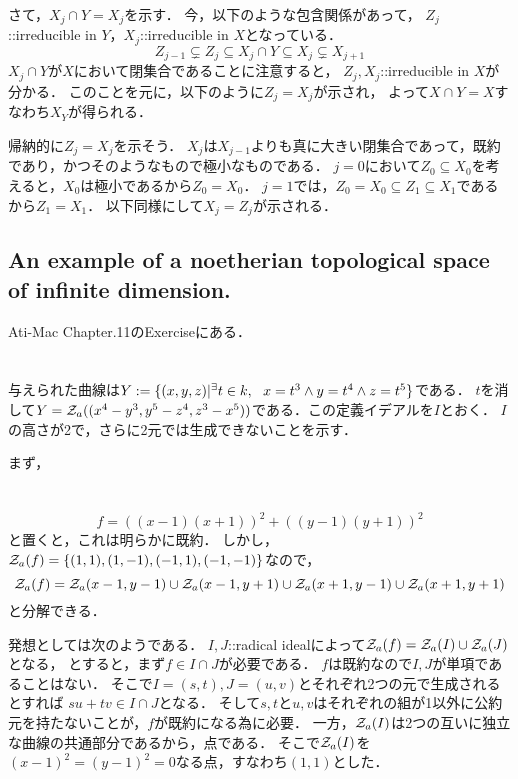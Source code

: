 \documentclass[a4paper]{jsarticle}
\begin{document}
    さて，$X_j \cap Y=X_j$を示す．
    今，以下のような包含関係があって，
    $Z_j$::irreducible in $Y$，$X_j$::irreducible in $X$となっている．
    \[ Z_{j-1} \subsetneq Z_j \subseteq X_j \cap Y \subseteq X_j \subsetneq X_{j+1} \]
    $X_j \cap Y$が$X$において閉集合であることに注意すると，
    $Z_j, X_j$::irreducible in $X$が分かる．
    このことを元に，以下のように$Z_j=X_j$が示され，
    よって$X \cap Y=X$すなわち$X_Y$が得られる．

    帰納的に$Z_j=X_j$を示そう．
    $X_j$は$X_{j-1}$よりも真に大きい閉集合であって，既約であり，かつそのようなもので極小なものである．
    $j=0$において$Z_0 \subseteq X_0$を考えると，$X_0$は極小であるから$Z_0=X_0$．
    $j=1$では，$Z_0=X_0 \subseteq Z_1 \subseteq X_1$であるから$Z_1=X_1$．
    以下同様にして$X_j=Z_j$が示される．

    \subsection{An example of a noetherian topological space of infinite dimension.}
    Ati-Mac Chapter.11のExerciseにある．

\section{} %
    与えられた曲線は$Y:=\{(x,y,z) | {}^{\exists} t \in k,~~ x=t^3 \land y=t^4 \land z=t^5\}$である．
    $t$を消して$Y=\mathcal{Z}_a((x^4-y^3, y^5-z^4, z^3-x^5))$である．この定義イデアルを$I$とおく．
    $I$の高さが2で，さらに2元では生成できないことを示す．

    まず，
    
\section{}
    \[ f=((x-1)(x+1))^2+((y-1)(y+1))^2 \]
    と置くと，これは明らかに既約．
    しかし，$\mathcal{Z}_a(f)=\{ (1,1), (1,-1), (-1,1), (-1,-1) \}$なので，
    \[ \mathcal{Z}_a(f)=\mathcal{Z}_a(x-1,y-1) \cup \mathcal{Z}_a(x-1,y+1) \cup \mathcal{Z}_a(x+1,y-1) \cup \mathcal{Z}_a(x+1,y+1)\]
    と分解できる．

    発想としては次のようである．
    $I,J$::radical idealによって$\mathcal{Z}_a(f)=\mathcal{Z}_a(I) \cup \mathcal{Z}_a(J)$となる，
    とすると，まず$f \in I \cap J$が必要である．
    $f$は既約なので$I,J$が単項であることはない．
    そこで$I=(s,t), J=(u,v)$とそれぞれ2つの元で生成されるとすれば
    $su+tv \in I \cap J$となる．
    そして$s,t$と$u,v$はそれぞれの組が1以外に公約元を持たないことが，$f$が既約になる為に必要．
    一方，$\mathcal{Z}_a(I)$は2つの互いに独立な曲線の共通部分であるから，点である．
    そこで$\mathcal{Z}_a(I)$を$(x-1)^2=(y-1)^2=0$なる点，すなわち$(1,1)$とした．
\end{document}
